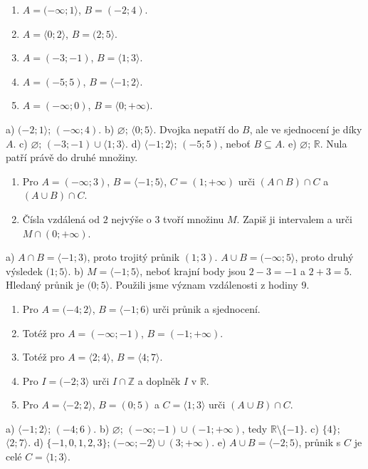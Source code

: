 \documentclass[11pt,a4paper]{article}
\begin{document}
\begin{zadaniReseniBox}[title={S1: vždy urči průnik i sjednocení},breakable=false]
\begin{enumerate}[label=\alph*)]
\item $A=(-\infty;1\rangle$, $B=(-2;4)$.
\item $A=\langle0;2\rangle$, $B=(2;5\rangle$.
\item $A=(-3;-1)$, $B=\langle1;3\rangle$.
\item $A=(-5;5)$, $B=\langle-1;2\rangle$.
\item $A=(-\infty;0)$, $B=\langle0;+\infty)$.
\end{enumerate}
\tcblower
a) $(-2;1\rangle$; $(-\infty;4)$.
b) $\varnothing$; $\langle0;5\rangle$.
Dvojka nepatří do $B$, ale ve sjednocení je díky $A$.
c) $\varnothing$; $(-3;-1)\cup\langle1;3\rangle$.
d) $\langle-1;2\rangle$; $(-5;5)$, neboť $B\subseteq A$.
e) $\varnothing$; $\mathbb R$. Nula patří právě do druhé množiny.
\end{zadaniReseniBox}

\begin{zadaniReseniBox}[title={R1: tři množiny a vzdálenost},breakable=false]
\begin{enumerate}[label=\alph*)]
\item Pro $A=(-\infty;3)$, $B=\langle-1;5\rangle$, $C=(1;+\infty)$
urči $(A\cap B)\cap C$ a $(A\cup B)\cap C$.
\item Čísla vzdálená od $2$ nejvýše o $3$ tvoří množinu $M$.
Zapiš ji intervalem a urči $M\cap(0;+\infty)$.
\end{enumerate}
\tcblower
a) $A\cap B=\langle-1;3)$, proto trojitý průnik $(1;3)$.
$A\cup B=(-\infty;5\rangle$, proto druhý výsledek $(1;5\rangle$.
b) $M=\langle-1;5\rangle$, neboť krajní body jsou $2-3=-1$ a $2+3=5$.
Hledaný průnik je $(0;5\rangle$. Použili jsme význam vzdálenosti z hodiny 9.
\end{zadaniReseniBox}

\begin{zadaniReseniBox}[title={D1: 12–18 minut; kresli osy}]
\begin{enumerate}[label=\alph*)]
\item Pro $A=(-4;2\rangle$, $B=\langle-1;6)$ urči průnik a sjednocení.
\item Totéž pro $A=(-\infty;-1)$, $B=(-1;+\infty)$.
\item Totéž pro $A=\langle2;4\rangle$, $B=\langle4;7\rangle$.
\item Pro $I=(-2;3\rangle$ urči $I\cap\mathbb Z$ a doplněk $I$ v $\mathbb R$.
\item Pro $A=\langle-2;2\rangle$, $B=(0;5)$ a $C=\langle1;3\rangle$
urči $(A\cup B)\cap C$.
\end{enumerate}
\tcblower
a) $\langle-1;2\rangle$; $(-4;6)$.
b) $\varnothing$; $(-\infty;-1)\cup(-1;+\infty)$, tedy $\mathbb R\setminus\{-1\}$.
c) $\{4\}$; $\langle2;7\rangle$.
d) $\{-1,0,1,2,3\}$; $(-\infty;-2\rangle\cup(3;+\infty)$.
e) $A\cup B=\langle-2;5)$, průnik s $C$ je celé $C=\langle1;3\rangle$.
\end{zadaniReseniBox}
\end{document}
